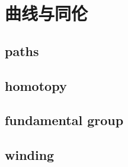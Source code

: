 \section{曲线与同伦}
\label{b3:sec:0901}


\subsection{paths}
\label{b3:subsec:090101}

\subsection{homotopy}
\label{b3:subsec:090102}

\subsection{fundamental group}
\label{b3:subsec:090103}

\subsection{winding}
\label{b3:subsec:090104}



